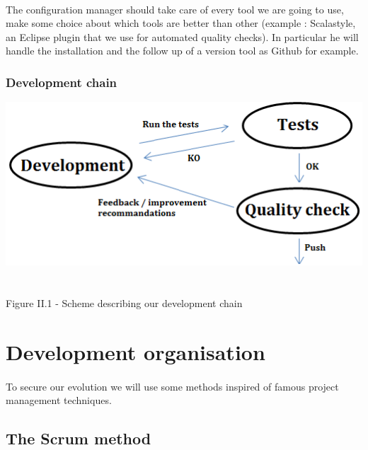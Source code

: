 \documentclass{report}
\begin{document}
\paragraph{}
\hspace{4mm}\textnormal{The configuration manager should take care of every tool we are going to use, make some choice about which tools are better than other (example :
Scalastyle, an Eclipse plugin that we use for automated quality checks).
In particular he will handle the installation and the follow up of a version tool as Github for example.}

\subsubsection{Development chain}

\begin{center}
\includegraphics[scale=0.7]{data/cycle_qualite}
~\\~\\Figure II.1 - Scheme describing our development chain
\end{center}

\section{Development organisation}

\paragraph{}
\hspace{4mm}\textnormal{To secure our evolution we will use some methods inspired of famous project management techniques.}

\subsection{The Scrum method}
\end{document}
